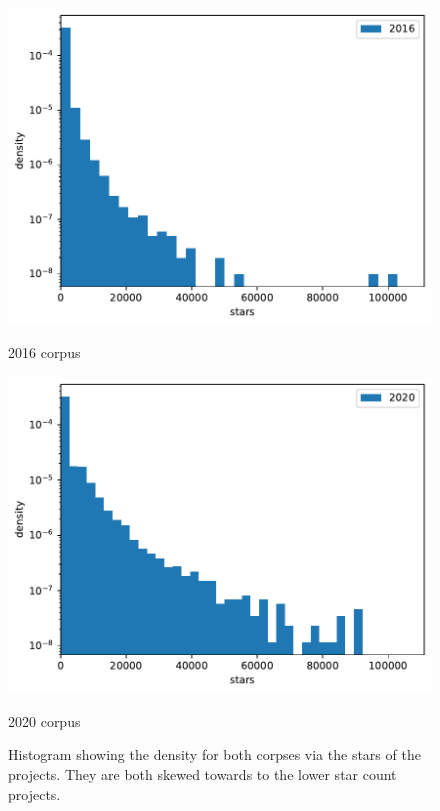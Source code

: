 \documentclass[twoside,12pt,titlepage,a4paper]{article}
\begin{document}
\begin{figure}[!htbp]
  \centering
  \begin{minipage}{.48\textwidth}
    \centering
    \includegraphics[width=\textwidth]{../src/results/density_2016.pdf}
    \caption[]{2016 corpus}
    \label{graph:hist2016}
  \end{minipage}
  \begin{minipage}{.48\textwidth}
    \centering
  \includegraphics[width=\textwidth]{../src/results/density_2020.pdf}
  \caption[]{2020 corpus}
  \label{graph:hist2020}
  \end{minipage}
  \caption[]{Histogram showing the density for both corpses via the stars of the projects. They are both skewed towards to the lower star count projects. }
  \label{graph:hist}

\end{figure}
\end{document}
